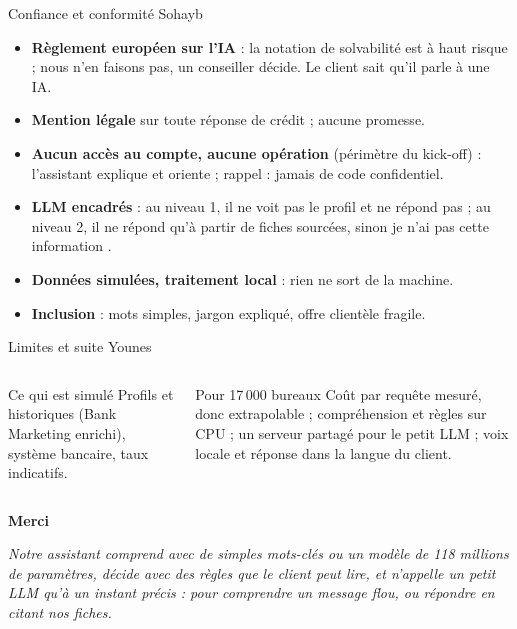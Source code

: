 \documentclass[aspectratio=169,11pt]{beamer}
\newcommand{\qui}[1]{\hfill{\scriptsize\color{darkgray}\mdseries #1}}
\begin{document}
\begin{frame}{Confiance et conformité \qui{Sohayb}}
  \begin{itemize}
    \item \textbf{Règlement européen sur l'IA} : la notation de solvabilité est à haut risque ;
          nous n'en faisons pas, un conseiller décide. Le client sait qu'il parle à une IA.
    \item \textbf{Mention légale} sur toute réponse de crédit ; aucune promesse.
    \item \textbf{Aucun accès au compte, aucune opération} (périmètre du kick-off) : l'assistant
          explique et oriente ; rappel : jamais de code confidentiel.
    \item \textbf{LLM encadrés} : au niveau 1, il ne voit pas le profil et ne répond pas ; au niveau 2, il ne
          répond qu'à partir de fiches sourcées, sinon \og je n'ai pas cette information \fg.
    \item \textbf{Données simulées, traitement local} : rien ne sort de la machine.
    \item \textbf{Inclusion} : mots simples, jargon expliqué, offre clientèle fragile.
  \end{itemize}
\end{frame}

\begin{frame}{Limites et suite \qui{Younes}}
  \begin{columns}[T]
    \begin{block}{Ce qui est simulé}
      Profils et historiques (Bank Marketing enrichi), système bancaire, taux indicatifs.
    \end{block}
    \begin{block}{Pour 17\,000 bureaux}
      Coût par requête mesuré, donc extrapolable ; compréhension et règles sur CPU ; un serveur
      partagé pour le petit LLM ; voix locale et réponse dans la langue du client.
    \end{block}
  \end{columns}
\end{frame}

\begin{frame}
  \centering
  \vfill
  {\Large\color{mainblue}\textbf{Merci}}\par
  \bigskip
  \begin{minipage}{0.82\textwidth}\centering
    \textit{Notre assistant comprend avec de simples mots-clés ou un modèle de 118 millions de
    paramètres, décide avec des règles que le client peut lire, et n'appelle un petit LLM qu'à un
    instant précis : pour comprendre un message flou, ou répondre en citant nos fiches.}
  \end{minipage}
  \vfill
\end{frame}
\end{document}
